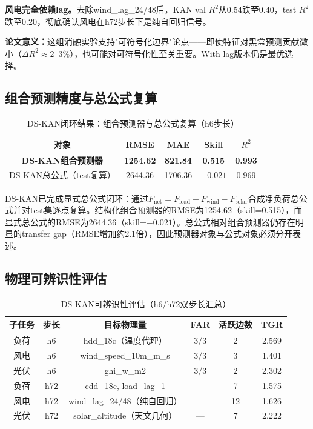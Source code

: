 \documentclass[12pt,a4paper,oneside]{ctexbook}
\begin{document}
\textbf{风电完全依赖lag。}去除wind\_lag\_24/48后，KAN val $R^2$从0.54跌至0.40，test $R^2$跌至0.20，彻底确认风电在h72步长下是纯自回归信号。

\textbf{论文意义：}这组消融实验支持"可符号化边界"论点——即使特征对黑盒预测贡献微小（$\Delta R^2 \approx 2\text{--}3\%$），也可能对可符号化性至关重要。With-lag版本仍是最优选择。

\subsection{组合预测精度与总公式复算}

\begin{table}[htbp]
\centering
\caption{DS-KAN闭环结果：组合预测器与总公式复算（h6步长）}
\label{tab:dskan-combo}
\begin{tabular}{ccccc}
\toprule
对象 & RMSE & MAE & Skill & $R^2$ \\
\midrule
\textbf{DS-KAN组合预测器} & \textbf{1254.62} & \textbf{821.84} & \textbf{0.515} & \textbf{0.993} \\
DS-KAN总公式（test复算） & 2644.36 & 1706.36 & $-0.021$ & 0.969 \\
\bottomrule
\end{tabular}
\end{table}

DS-KAN已完成显式总公式闭环：通过$F_{\text{net}} = F_{\text{load}} - F_{\text{wind}} - F_{\text{solar}}$合成净负荷总公式并对test集逐点复算。结构化组合预测器的RMSE为1254.62（skill=0.515），而显式总公式的RMSE为2644.36（skill=$-0.021$）。总公式相对组合预测器仍存在明显的transfer gap（RMSE增加约2.1倍），因此预测器对象与公式对象必须分开表述。

\subsection{物理可辨识性评估}

\begin{table}[htbp]
\centering
\caption{DS-KAN可辨识性评估（h6/h72双步长汇总）}
\label{tab:dskan-identifiability}
\begin{tabular}{cccccc}
\toprule
子任务 & 步长 & 目标物理量 & FAR & 活跃边数 & TGR \\
\midrule
负荷 & h6 & hdd\_18c（温度代理） & 3/3 & 2 & 2.569 \\
风电 & h6 & wind\_speed\_10m\_m\_s & 3/3 & 3 & 1.401 \\
光伏 & h6 & ghi\_w\_m2 & 3/3 & 2 & 2.302 \\
\midrule
负荷 & h72 & cdd\_18c, load\_lag\_1 & — & 7 & 1.575 \\
风电 & h72 & wind\_lag\_24/48（纯自回归） & — & 12 & 1.626 \\
光伏 & h72 & solar\_altitude（天文几何） & — & 7 & 2.222 \\
\bottomrule
\end{tabular}
\end{table}
\end{document}
